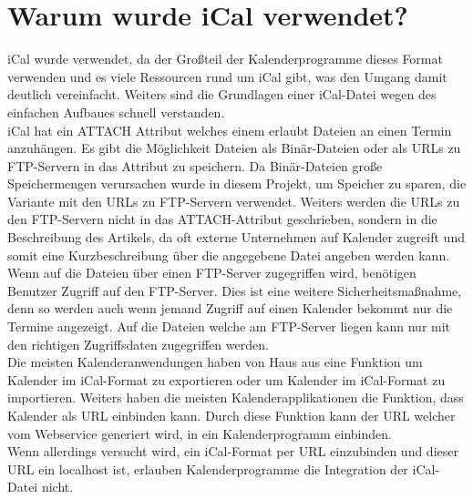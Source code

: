 \section{Warum wurde iCal verwendet?}
\label{sec:warumWurdeiCalVerwendet?}
iCal wurde verwendet, da der Großteil der Kalenderprogramme dieses Format verwenden und es viele Ressourcen rund um iCal gibt, was den Umgang damit deutlich vereinfacht. Weiters sind die Grundlagen einer iCal-Datei wegen des einfachen Aufbaues schnell verstanden.\\
iCal hat ein ATTACH Attribut welches einem erlaubt Dateien an einen Termin anzuhängen. Es gibt die Möglichkeit Dateien als Binär-Dateien oder als URLs zu FTP-Servern in das Attribut zu speichern. Da Binär-Dateien große Speichermengen verursachen wurde in diesem Projekt, um Speicher zu sparen, die Variante mit den URLs zu FTP-Servern verwendet. Weiters werden die URLs zu den FTP-Servern nicht in das ATTACH-Attribut geschrieben, sondern in die Beschreibung des Artikels, da oft externe Unternehmen auf Kalender zugreift und somit eine Kurzbeschreibung über die angegebene Datei angeben werden kann. Wenn auf die Dateien über einen FTP-Server zugegriffen wird, benötigen Benutzer Zugriff auf den FTP-Server. Dies ist eine weitere Sicherheitsmaßnahme, denn so werden auch wenn jemand Zugriff auf einen Kalender bekommt nur die Termine angezeigt. Auf die Dateien welche am FTP-Server liegen kann nur mit den richtigen Zugriffsdaten zugegriffen werden.\\
Die meisten Kalenderanwendungen haben von Haus aus eine Funktion um Kalender im iCal-Format zu exportieren oder um Kalender im iCal-Format zu importieren. Weiters haben die meisten Kalenderapplikationen die Funktion, dass Kalender als URL einbinden kann. Durch diese Funktion kann der URL welcher vom Webservice generiert wird, in ein Kalenderprogramm einbinden.
\\
Wenn allerdings versucht wird, ein iCal-Format per URL einzubinden und dieser URL ein localhost ist, erlauben Kalenderprogramme die Integration der iCal-Datei nicht.

